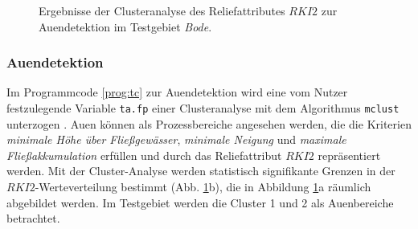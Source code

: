 \begin{figure}[t]
\centering{}\quad
\centering{}
\caption{Ergebnisse der Clusteranalyse des Reliefattributes $RKI2$ zur Auendetektion im Testgebiet \textit{Bode}.}\label{fig:class-floodplain}
\end{figure}

\subsubsection{Auendetektion}\label{sec:ext-fp}
Im Programmcode \ref{prog:tc} zur Auendetektion wird eine vom Nutzer festzulegende Variable \texttt{ta.fp} einer Clusteranalyse mit dem Algorithmus \texttt{mclust} unterzogen \citep{FraleyRaftery2002jasa}. Auen können als Prozessbereiche angesehen werden, die die Kriterien \textit{minimale Höhe über Fließgewässer}, \textit{minimale Neigung} und  \textit{maximale Fließakkumulation}  erfüllen und durch das  Reliefattribut $RKI2$ repräsentiert werden. Mit der Cluster-Analyse werden statistisch signifikante Grenzen in der $RKI2$-Werteverteilung bestimmt (Abb. \ref{fig:class-floodplain}b), die in Abbildung  \ref{fig:class-floodplain}a räumlich abgebildet werden. Im Testgebiet werden die Cluster 1 und 2 als Auenbereiche betrachtet.

